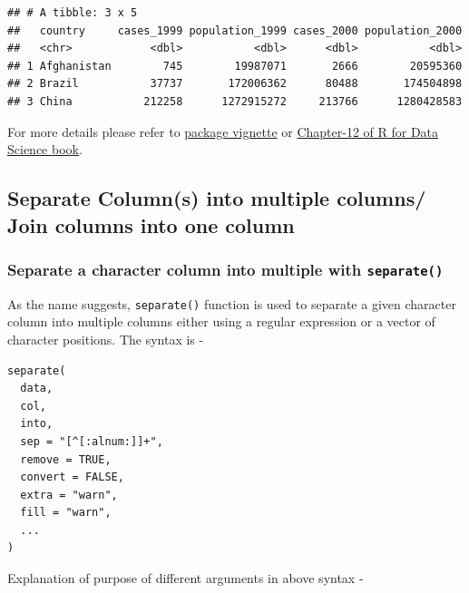 \documentclass[
]{book}
\begin{document}
\begin{verbatim}
## # A tibble: 3 x 5
##   country     cases_1999 population_1999 cases_2000 population_2000
##   <chr>            <dbl>           <dbl>      <dbl>           <dbl>
## 1 Afghanistan        745        19987071       2666        20595360
## 2 Brazil           37737       172006362      80488       174504898
## 3 China           212258      1272915272     213766      1280428583
\end{verbatim}

For more details please refer to \href{https://tidyr.tidyverse.org/articles/pivot.html}{package vignette} or \href{https://r4ds.had.co.nz/tidy-data.html}{Chapter-12 of R for Data Science book}.

\hypertarget{separate-columns-into-multiple-columns-join-columns-into-one-column}{%
\subsection{Separate Column(s) into multiple columns/ Join columns into one column}\label{separate-columns-into-multiple-columns-join-columns-into-one-column}}

\hypertarget{separate-a-character-column-into-multiple-with-separate}{%
\subsubsection*{\texorpdfstring{Separate a character column into multiple with \texttt{separate()}}{Separate a character column into multiple with separate()}}\label{separate-a-character-column-into-multiple-with-separate}}

As the name suggests, \texttt{separate()} function is used to separate a given character column into multiple columns either using a regular expression or a vector of character positions.
The syntax is -

\begin{verbatim}
separate(
  data,
  col,
  into,
  sep = "[^[:alnum:]]+",
  remove = TRUE,
  convert = FALSE,
  extra = "warn",
  fill = "warn",
  ...
)
\end{verbatim}

Explanation of purpose of different arguments in above syntax -
\end{document}

